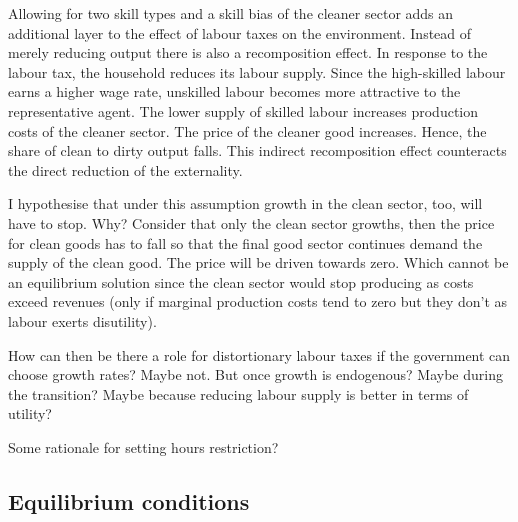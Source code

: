 Allowing for two skill types and a skill bias of the cleaner sector adds an additional layer to the effect of labour taxes on the environment. Instead of merely reducing output there is also a recomposition effect. 
In response to the labour tax, the household reduces its labour supply. Since the high-skilled labour earns a higher wage rate, unskilled labour becomes more attractive to the representative agent. The lower supply of skilled labour increases production costs of the cleaner sector. The price of the cleaner good increases. Hence, the share of clean to dirty output falls. This indirect recomposition effect counteracts the direct reduction of the externality. 

I hypothesise that under this assumption growth in the clean sector, too, will have to stop. Why? Consider that only the clean sector growths, then the price for clean goods has to fall so that the final good sector  continues demand the supply of the clean good. The price will be driven towards zero. Which cannot be an equilibrium solution since the clean sector would stop producing as costs exceed revenues (only if marginal production costs tend to zero but they don't as labour exerts disutility).

How can then be there a role for distortionary labour taxes if the government can choose growth rates? Maybe not. But once growth is endogenous? Maybe during the transition? 
Maybe because reducing labour supply is better in terms of utility? 

Some rationale for setting hours restriction? 
\subsection{Equilibrium conditions}

